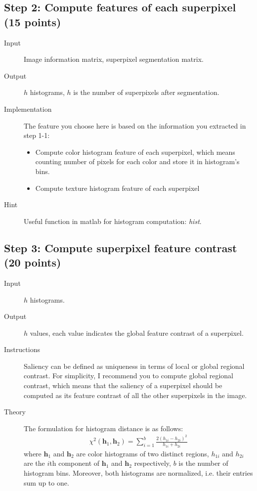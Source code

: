 \documentclass[12pt]{article}
\begin{document}
\subsection{Step 2: Compute features of each superpixel (15 points)}

\begin{description}
\item[Input] Image information matrix, superpixel segmentation matrix. 
\item[Output] $h$ histograms, $h$ is the number of superpixels after segmentation.
\item[Implementation] The feature you choose here is based on the information you extracted in step 1-1:
\begin{itemize}
\item Compute color histogram feature of each superpixel, which means counting number of pixels for each color and store it in histogram's bins.
\item Compute texture histogram feature of each superpixel
\end{itemize}
\item[Hint] Useful function in matlab for histogram computation: \emph{hist}.
\end{description}

\subsection{Step 3: Compute superpixel feature contrast (20 points)}

\begin{description}
\item[Input] $h$ histograms.
\item[Output] $h$ values, each value indicates the global feature contrast of a superpixel.
\item[Instructions] Saliency can be defined as uniqueness in terms of local or global regional contrast. For simplicity, I recommend you to compute global regional contrast, which means that the saliency of a superpixel should be computed as its feature contrast of all the other superpixels in the image. 
\item[Theory] The formulation for histogram distance is as follows:
\begin{align}
\chi^2(\textbf{h}_1, \textbf{h}_2) = \sum_{i=1}^{b}\frac{2(h_{1i}-h_{2i})^2}{h_{1i}+h_{2i}}
\end{align}
where $\textbf{h}_1$ and $\textbf{h}_2$ are color histograms of two distinct regions,  $h_{1i}$ and $h_{2i}$ are the $i$th component of $\textbf{h}_1$ and $\textbf{h}_2$ respectively, $b$ is the number of histogram bins. Moreover, both histograms are normalized, i.e. their entries sum up to one.
\end{description}
\end{document}
